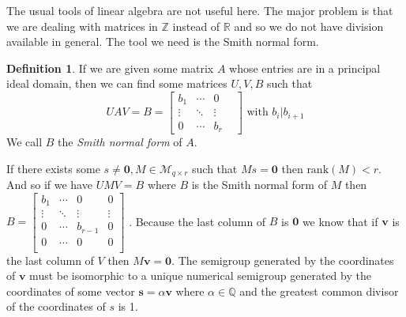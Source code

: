 \documentclass[11pt]{amsart}
\theoremstyle{plain}
\theoremstyle{definition}
\newtheorem{defi}{Definition}
\begin{document}
The usual tools of linear algebra are not useful here. The major problem is that we are dealing with matrices in $\mathbb{Z}$ instead of $\mathbb{R}$ and so we do not have division available in general. The tool we need is the Smith normal form.
\begin{defi}
  If we are given some matrix $A$ whose entries are in a principal ideal domain,
  then we can find some matrices $U,V,B$ such that
\[UAV=B=
\left[\begin{array}{cccc}
  b_1&\cdots&0\\
  \vdots&\ddots&\vdots \\
  0&\cdots&b_r&
\end{array}\right]
\text{ with }b_i|b_{i+1}\]
We call $B$ the \emph{Smith normal form} of $A$.\cite{adkins}
\end{defi}
If there exists some $s\ne \mathbf{0}, M\in \mathcal{M}_{q\times r}$ such that $Ms=\mathbf{0}$ then $\text{rank}(M)<r$. And so if we have $UMV=B$ where $B$ is the Smith normal form of $M$ then $B=\left[\begin{array}{ccccc}
  b_1&\cdots&0&0\\
  \vdots&\ddots&\vdots&\vdots \\
  0&\cdots&b_{r-1}&0\\
  0&\cdots&0&0\\
\end{array}\right]
$
. Because the last column of $B$ is $\mathbf{0}$ we know that if $\mathbf{v}$ is the last column of $V$ then $M\mathbf{v}=\mathbf{0}$. The semigroup generated by the coordinates of $\mathbf{v}$ must be isomorphic to a unique numerical semigroup generated by the coordinates of some vector $\mathbf{s}=\alpha\mathbf{v}$ where $\alpha\in \mathbb{Q}$ and the greatest common divisor of the coordinates of $s$ is 1.
\end{document}
